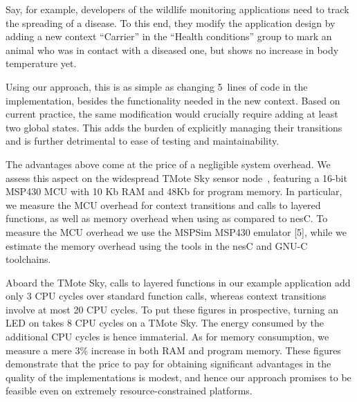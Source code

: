 Say, for example, developers of the wildlife monitoring applications
need to track the spreading of a disease. To this end, they modify the
application design by adding a new context ``Carrier'' in the ``Health
conditions'' group to mark an animal who was in contact with a
diseased one, but shows no increase in body temperature yet.

Using our approach, this is as simple as changing 5~lines of code in
the \conesc implementation, besides the functionality needed in the
new  context.  Based on current practice, the same
modification would crucially require adding at least two global
states.  This adds the burden of explicitly managing their transitions
and is further detrimental to ease of testing and maintainability.

 The advantages above come at the price
of a negligible system overhead. We assess this aspect on the
widespread TMote Sky sensor node~\cite{polastre05telos}, featuring a
16-bit MSP430 MCU with 10 Kb RAM and 48Kb for program memory. In
particular, we measure the MCU overhead for context transitions and
calls to layered functions, as well as memory overhead when using
\conesc as compared to nesC. To measure the MCU overhead we use the
MSPSim MSP430 emulator [5], while we estimate the memory overhead
using the tools in the nesC and GNU-C toolchains.

Aboard the TMote Sky, calls to layered functions in our example
application add only 3 CPU cycles over standard function calls,
whereas context transitions involve at most 20 CPU cycles. To put
these figures in prospective, turning an LED on takes 8 CPU cycles on
a TMote Sky. The energy consumed by the additional CPU cycles is hence
immaterial. As for memory consumption, we measure a mere 3\% increase
in both RAM and program memory. These figures demonstrate that the
price to pay for obtaining significant advantages in the quality of
the implementations is modest, and hence our approach promises to be 
feasible even on extremely resource-constrained platforms.





